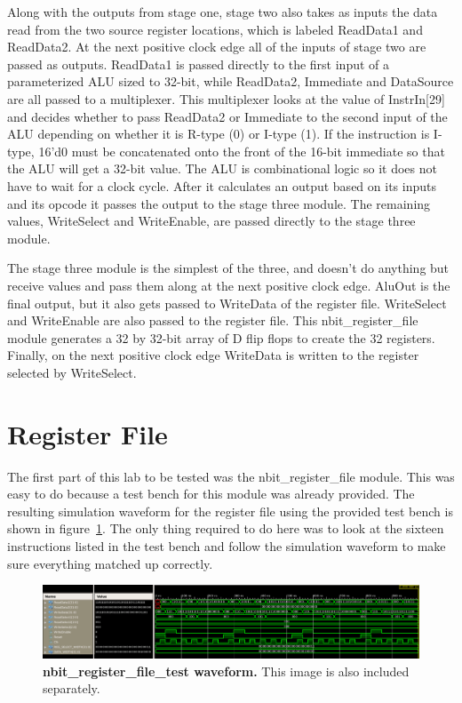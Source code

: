 \documentclass[letterpaper,12pt]{article}
\begin{document}
Along with the outputs from stage one, stage two also takes as inputs the data read from the two source register locations, which is labeled ReadData1 and ReadData2. At the next positive clock edge all of the inputs of stage two are passed as outputs. ReadData1 is passed directly to the first input of a parameterized ALU sized to 32-bit, while ReadData2, Immediate and DataSource are all passed to a multiplexer. This multiplexer looks at the value of InstrIn[29] and decides whether to pass ReadData2 or Immediate to the second input of the ALU depending on whether it is R-type (0) or I-type (1). If the instruction is I-type, 16'd0 must be concatenated onto the front of the 16-bit immediate so that the ALU will get a 32-bit value. The ALU is combinational logic so it does not have to wait for a clock cycle. After it calculates an output based on its inputs and its opcode it passes the output to the stage three module. The remaining values, WriteSelect and WriteEnable, are passed directly to the stage three module. 

The stage three module is the simplest of the three, and doesn't do anything but receive values and pass them along at the next positive clock edge. AluOut is the final output, but it also gets passed to WriteData of the register file. WriteSelect and WriteEnable are also passed to the register file. This nbit\_register\_file module generates a 32 by 32-bit array of D flip flops to create the 32 registers. Finally, on the next positive clock edge WriteData is written to the register selected by WriteSelect. 

\section{Register File}

The first part of this lab to be tested was the nbit\_register\_file module. This was easy to do because a test bench for this module was already provided. The resulting simulation waveform for the register file using the provided test bench is shown in figure~\ref{fig:Filewaveform}. The only thing required to do here was to look at the sixteen instructions listed in the test bench and follow the simulation waveform to make sure everything matched up correctly. 

\begin{figure}[h] 
\centering
        \includegraphics[width=1.0\columnwidth]{Reg_file_waveform}

        \caption{
                \label{fig:Filewaveform}
                {\bf nbit\_register\_file\_test waveform.}
               This image is also included separately.
        }
\end{figure}
\end{document}
